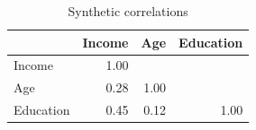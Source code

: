 \documentclass[11pt]{article}
\begin{document}
\begin{table}[htbp]\centering\caption{Synthetic correlations}
\begin{tabular}{lrrr}\toprule & Income & Age & Education\\\midrule
Income & 1.00 & &\\Age & 0.28 & 1.00 &\\Education & 0.45 & 0.12 & 1.00\\\bottomrule\end{tabular}\end{table}
\end{document}
